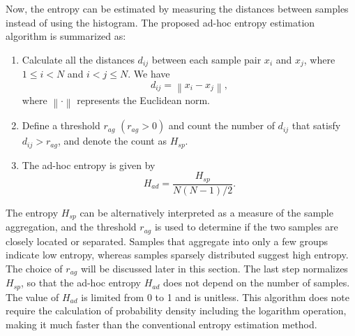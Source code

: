 \documentclass[journal,comsoc]{IEEEtran}
\begin{document}
Now, the entropy can be estimated by  measuring the distances between samples instead of using the histogram.
The proposed ad-hoc entropy estimation algorithm is summarized as:
\begin{enumerate}
\item Calculate all the distances \(d_{ij}\) between each sample pair \(x_i\) and \(x_j\), where \(1\le i<N\) and \( i<j \le N\). We have
 \begin{equation}
d_{ij}=\left\|x_i-x_j \right\|,
\label{eq:distance}
\end{equation}
where \(\left\| \cdot \right\|\) represents the Euclidean norm.
\item Define a threshold \(r_{ag}\) \((r_{ag}>0)\) and count the number of \(d_{ij}\) that satisfy $d_{ij}>r_{ag}$, and denote the count as $H_{sp}$.
\item The ad-hoc entropy is given by
\begin{equation}
H_{ad}= \frac{ H_{sp}}{ N(N-1)/2}.
\label{eq:entorpy_ad}
\end{equation}
\end{enumerate}

The entropy \(H_{sp}\) can be alternatively interpreted as a measure of the sample aggregation,
and the threshold \(r_{ag}\) is used to determine if the two samples are closely located or separated.
Samples that aggregate into only a few groups indicate low entropy, whereas samples sparsely distributed suggest high entropy.
The choice of \(r_{ag}\) will be discussed later in this section.
The last step normalizes $H_{sp}$, so that the ad-hoc entropy $H_{ad}$ does not depend on the number of samples.
The value of $H_{ad}$ is limited from 0 to 1 and is unitless.
This algorithm does note require the calculation of probability density including the logarithm operation, making it much faster than the conventional entropy estimation method.

\end{document}
